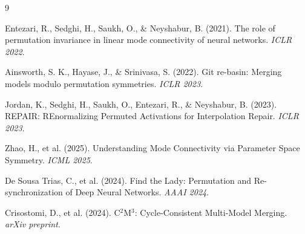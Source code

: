 \documentclass[11pt,a4paper]{article}
\begin{document}

\begin{thebibliography}{9}

Entezari, R., Sedghi, H., Saukh, O., \& Neyshabur, B. (2021).
The role of permutation invariance in linear mode connectivity of neural networks.
\textit{ICLR 2022}.

Ainsworth, S. K., Hayase, J., \& Srinivasa, S. (2022).
Git re-basin: Merging models modulo permutation symmetries.
\textit{ICLR 2023}.

Jordan, K., Sedghi, H., Saukh, O., Entezari, R., \& Neyshabur, B. (2023).
REPAIR: REnormalizing Permuted Activations for Interpolation Repair.
\textit{ICLR 2023}.

Zhao, H., et al. (2025).
Understanding Mode Connectivity via Parameter Space Symmetry.
\textit{ICML 2025}.

De Sousa Trias, C., et al. (2024).
Find the Lady: Permutation and Re-synchronization of Deep Neural Networks.
\textit{AAAI 2024}.

Crisostomi, D., et al. (2024).
C$^2$M$^3$: Cycle-Consistent Multi-Model Merging.
\textit{arXiv preprint}.

\end{thebibliography}
\end{document}
